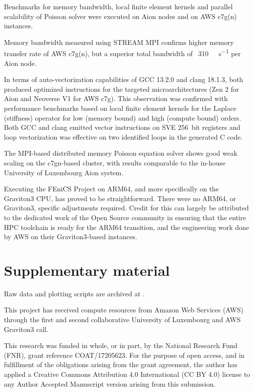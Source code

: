 Benchmarks for memory bandwidth, local finite element kernels and parallel
scalability of Poisson solver were executed on Aion nodes and on AWS c7g(n)
instances.

Memory bandwidth measured using STREAM MPI confirms higher memory transfer rate
of AWS c7g(n), but a superior total bandwidth of ~\SI{310}{\giga\byte\per\second}
per Aion node.

In terms of auto-vectorization capabilities of GCC 13.2.0 and clang 18.1.3,
both produced optimized instructions for the targeted microarchitectures (Zen 2
for Aion and Neoverse V1 for AWS c7g). This observation was confirmed with
performance benchmarks based on local finite element kernels for the Laplace
(stiffness) operator for low (memory bound) and high (compute bound) orders.
Both GCC and clang emitted vector instructions on SVE \SI{256}{bit} registers
and loop vectorization was effective on two identified loops in the generated C
code.

The MPI-based distributed memory Poisson equation solver shows good weak
scaling on the c7gn-based cluster, with results comparable to the in-house
University of Luxembourg Aion system.

Executing the FEniCS Project on ARM64, and more specifically on the Graviton3
CPU, has proved to be straightforward. There were no ARM64, or Graviton3,
specific adjustments required. Credit for this can largely be attributed to the
dedicated work of the Open Source community in ensuring that the entire HPC
toolchain is ready for the ARM64 transition, and the engineering work done by
AWS on their Graviton3-based instances.

\section*{Supplementary material}
Raw data and plotting scripts are archived at \citep{}.

\begin{acknowledgement}
This project has received compute resources from Amazon Web Services (AWS)
through the first and second collaborative University of Luxembourg and
AWS Graviton3 call.

This research was funded in whole, or in part, by the National Research Fund
(FNR), grant reference COAT/17205623. For the purpose of open access, and in
fulfillment of the obligations arising from the grant agreement, the author has
applied a Creative Commons Attribution 4.0 International (CC BY 4.0) license to
any Author Accepted Manuscript version arising from this submission.
\end{acknowledgement}





